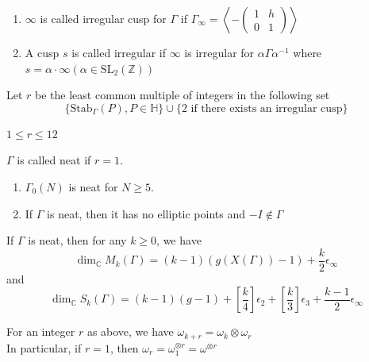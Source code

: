 \documentclass[oneside, 12pt]{scrbook}
\newcommand{\CC}{\mathbb C}
\newcommand{\ZZ}{\mathbb Z}
\newcommand{\SL}{\mathrm{SL}}
\theoremstyle{theorem}
\begin{document}
\begin{definition}
\begin{enumerate}
\item $\infty$ is called irregular cusp for $\Gamma$ if $\Gamma_{\infty} = \left\langle -\begin{pmatrix}
1 & h \\ 0 & 1 
\end{pmatrix} \right\rangle$
\item A cusp $s$ is called irregular if $\infty$ is irregular for $\alpha \Gamma \alpha^{-1}$ where $s= \alpha \cdot \infty (\alpha \in \SL_{2}(\ZZ))$
\end{enumerate}
\end{definition}

\begin{definition}
Let $r$ be the least common multiple of integers in the following set $$\{\mathrm{Stab}_{\Gamma}(P), P \in \mathbb{H}\} \cup \{2 \text{ if there exists an irregular cusp}\}$$
\end{definition}

\begin{exercise}
$1\le r \le 12$
\end{exercise}

\begin{definition}
$\Gamma$ is called neat if $r=1$.
\end{definition}

\begin{exercise}
\begin{enumerate}
\item $\Gamma_{0}(N)$ is neat for $N \geq 5$.
\item If $\Gamma$ is neat, then it has no elliptic points and $-I \not \in \Gamma$
\end{enumerate}
\end{exercise}

\begin{theorem}
If $\Gamma$ is neat, then for any $k \geq 0$, we have $$\dim_{\CC} M_{k}(\Gamma) = (k-1)(g(X(\Gamma))-1) + \frac{k}{2} \epsilon_{\infty}$$ and $$\dim_{\CC} S_{k}(\Gamma) = (k-1)(g-1) + \left[ \frac{k}{4} \right] \epsilon_{2} + \left[ \frac{k}{3} \right] \epsilon_{3} + \frac{k-1}{2} \epsilon_{\infty}$$
\end{theorem}

\begin{remark}[Fact]
For an integer $r$ as above, we have $\omega_{k + r} = \omega_{k} \otimes \omega_{r}$ \\

In particular, if $r=1$, then $\omega_{r} = \omega_{1}^{\otimes r}  = \omega^{\otimes r}$
\end{remark}
\end{document}
